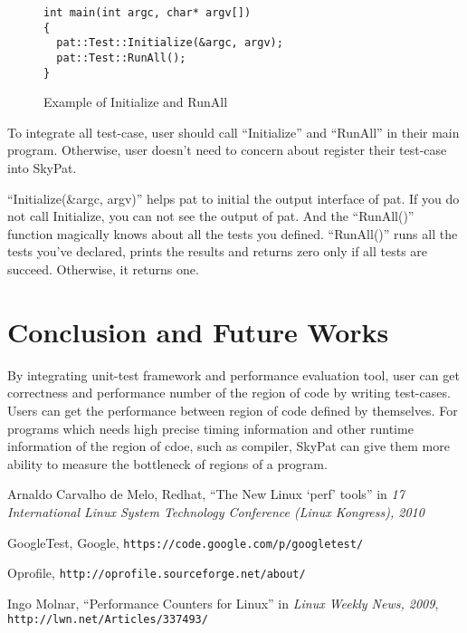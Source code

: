 \documentclass[final]{ols}
\begin{document}
\begin{figure}[h]
\lstset{language=C++}
\begin{lstlisting}[frame=single]
int main(int argc, char* argv[])
{
  pat::Test::Initialize(&argc, argv);
  pat::Test::RunAll();
}
\end{lstlisting}
\caption{Example of Initialize and RunAll}
\label{main_example}
\end{figure}

To integrate all test-case, user should call ``Initialize'' and ``RunAll'' in their main program.
Otherwise, user doesn't need to concern about register their test-case into SkyPat.

``Initialize(\&argc, argv)'' helps pat to initial the output interface of pat. If you do not call Initialize, you can not see the output of pat.
And the ``RunAll()'' function magically knows about all the tests you defined.
``RunAll()'' runs all the tests you've declared, prints the results and returns zero only if all tests are succeed. Otherwise, it returns one.

\section{Conclusion and Future Works}
By integrating unit-test framework and performance evaluation tool, user can get correctness and performance number of the region of code by writing test-cases.
Users can get the performance between region of code defined by themselves.
For programs which needs high precise timing information and other runtime information of the region of cdoe, such as compiler, SkyPat can give them more ability to measure the bottleneck of regions of a program.

\begin{thebibliography}{99}  %
Arnaldo Carvalho de Melo, Redhat, ``The New Linux `perf' tools'' in \emph{17 International Linux System Technology Conference (Linux Kongress), 2010}

GoogleTest, Google, \texttt{\small https://code.google.com/p/googletest/}

Oprofile, \texttt{\small \newline http://oprofile.sourceforge.net/about/}

Ingo Molnar, ``Performance Counters for Linux'' in \emph{Linux Weekly News, 2009}, \texttt{\small http://lwn.net/Articles/337493/}

\end{thebibliography}
\end{document}
